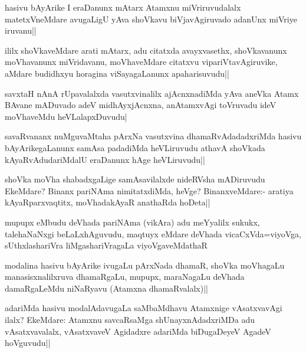 \begin{artha}
hasivu bAyArike I eraDanunx mAtarx Atamxnu miVriruvudalalx matetxVneMdare avugaLigU yAva shoVkavu biVjavAgiruvado adanUnx miVriye iruvanu||
\end{artha}


\begin{artha}%
ililx shoVkaveMdare arati mAtarx, adu citatxda avayxvasethx, shoVkavanunx moVhavanunx miVridavanu, moVhaveMdare citatxvu vipariVtavAgiruvike, aMdare budidhxyu horagina viSayagaLanunx apaharisuvudu||
\end{artha}

\begin{artha}
savxtaH nAnA rUpavalalxda vasutxvinalilx ajAcnxnadiMda yAva aneVka Atamx BAvane mADuvado adeV midhAyxjAcnxna, anAtamxvAgi toVruvadu ideV moVhaveMdu heVLalapxDuvudu|
\end{artha}


\begin{artha}
savaRvananx nuMguvaMtaha pArxNa vasutxvina dhamaRvAdadadxriMda hasivu bAyArikegaLanunx samAsa padadiMda heVLiruvudu athavA shoVkada kAyaRvAdudariMdalU eraDanunx hAge heVLiruvudu||
\end{artha}

\begin{artha}
shoVka moVha shabadxgaLige samAsavilalxde nideRVsha mADiruvudu EkeMdare? Binanx pariNAma nimitatxdiMda, heVge? BinanxveMdare:- aratiya kAyaRparxvaqtitx, moVhadakAyaR anathaRda hoDeta||
\end{artha}

\begin{artha}
mupupx eMbudu deVhada pariNAma (vikAra) adu meYyalilx sukukx, talehaNaNxgi beLaLxhAguvudu, maqtuyx eMdare deVhada vicaCxVda=viyoVga, sUthxlashariVra liMgashariVragaLa viyoVgaveMdathaR
\end{artha}


\begin{artha}
modalina hasivu bAyArike ivugaLu pArxNada dhamaR, shoVka moVhagaLu manasisxnalilxruva dhamaRgaLu, mupupx, maraNagaLu deVhada damaRgaLeMdu niNaRyavu (Atamxna dhamaRvalalx)||
\end{artha}

\begin{artha}
adariMda hasivu modalAdavugaLa saMbaMdhavu Atamxnige vAsatxvavAgi ilalx? EkeMdare: Atamxnu savcaRsaMga shUnayxnAdadxriMDa adu vAsatxvavalalx, vAsatxvaveV Agidadxre adariMda biDugaDeyeV AgadeV hoVguvudu||
\end{artha}

